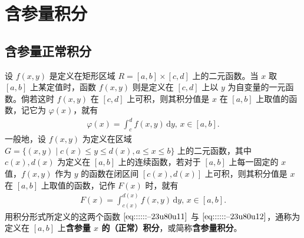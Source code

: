 \documentclass[../../main.tex]{subfiles}
\begin{document}
\section{含参量积分}

\subsection{含参量正常积分}

\begin{definition}[含参量积分]
设 \( f(x,y) \) 是定义在矩形区域 \( R = [a,b] \times [c,d] \) 上的二元函数。当 \( x \) 取 \( [a,b] \) 上某定值时，函数 \( f(x,y) \) 则是定义在 \( [c,d] \) 上以 \( y \) 为自变量的一元函数。倘若这时 \( f(x,y) \) 在 \( [c,d] \) 上可积，则其积分值是 \( x \) 在 \( [a,b] \) 上取值的函数，记它为 \( \varphi(x) \)，就有
\begin{align}
\varphi(x) = \int_{c}^{d} f(x,y) \, \mathrm{d}y, \, x \in [a,b]. \label{eq::::::--23u80u11}
\end{align}
一般地，设 \( f(x,y) \) 为定义在区域 \( G = \{ (x,y) \mid c(x) \leqslant y \leqslant d(x), a \leqslant x \leqslant b \} \) 上的二元函数，其中 \( c(x), d(x) \) 为定义在 \( [a,b] \) 上的连续函数，若对于 \( [a,b] \) 上每一固定的 \( x \) 值，\( f(x,y) \) 作为 \( y \) 的函数在闭区间 \( [c(x),d(x)] \) 上可积，则其积分值是 \( x \) 在 \( [a,b] \) 上取值的函数，记作 \( F(x) \) 时，就有
\begin{align}
F(x) = \int_{c(x)}^{d(x)} f(x,y) \, \mathrm{d}y, \, x \in [a,b]. \label{eq::::::--23u80u12}
\end{align}
用积分形式所定义的这两个函数 \(\eqref{eq::::::--23u80u11}\) 与 \(\eqref{eq::::::--23u80u12}\)，通称为定义在 \( [a,b] \) 上\textbf{含参量 \( x \) 的（正常）积分}，或简称\textbf{含参量积分}。
\end{definition}
\end{document}
